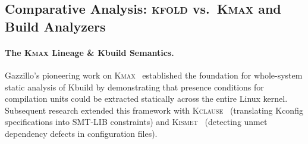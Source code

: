 \documentclass[acmsmall,screen,review]{acmart}
\newcommand{\tool}{\textsc{kfold}\xspace}
\begin{document}
\subsection{Comparative Analysis: \tool vs.\ \textsc{Kmax} and Build Analyzers}
\label{sec:related:kmax-comparison}

\paragraph{The \textsc{Kmax} Lineage \& Kbuild Semantics.}
Gazzillo's pioneering work on \textsc{Kmax}~\cite{kmax,gazzillo2018localizing} established the foundation for whole-system static analysis of Kbuild by demonstrating that presence conditions for compilation units could be extracted statically across the entire Linux kernel. Subsequent research extended this framework with \textsc{Kclause}~\cite{oh2021kclause} (translating Kconfig specifications into SMT-LIB constraints) and \textsc{Kismet}~\cite{yildiran2021kismet} (detecting unmet dependency defects in configuration files).
\end{document}
